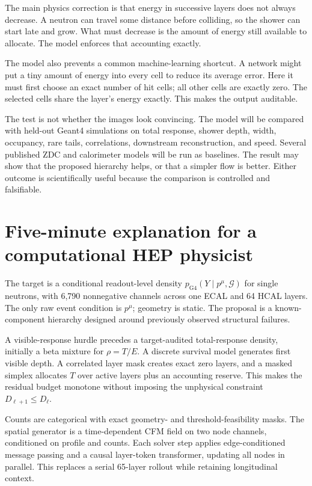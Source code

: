 \documentclass[11pt]{article}
\theoremstyle{definition}
\theoremstyle{remark}
\newcommand{\pG}{p_{\mathrm{G4}}}
\newcommand{\G}{\mathcal{G}}
\begin{document}
The main physics correction is that energy in successive layers does not always decrease. A neutron can travel some distance before colliding, so the shower can start late and grow. What must decrease is the amount of energy still available to allocate. The model enforces that accounting exactly.

The model also prevents a common machine-learning shortcut. A network might put a tiny amount of energy into every cell to reduce its average error. Here it must first choose an exact number of hit cells; all other cells are exactly zero. The selected cells share the layer's energy exactly. This makes the output auditable.

The test is not whether the images look convincing. The model will be compared with held-out Geant4 simulations on total response, shower depth, width, occupancy, rare tails, correlations, downstream reconstruction, and speed. Several published ZDC and calorimeter models will be run as baselines. The result may show that the proposed hierarchy helps, or that a simpler flow is better. Either outcome is scientifically useful because the comparison is controlled and falsifiable.

\section{Five-minute explanation for a computational HEP physicist}
The target is a conditional readout-level density $\pG(Y\mid p^\mu,\G)$ for single neutrons, with 6,790 nonnegative channels across one ECAL and 64 HCAL layers. The only raw event condition is $p^\mu$; geometry is static. The proposal is a known-component hierarchy designed around previously observed structural failures.

A visible-response hurdle precedes a target-audited total-response density, initially a beta mixture for $\rho=T/E$. A discrete survival model generates first visible depth. A correlated layer mask creates exact zero layers, and a masked simplex allocates $T$ over active layers plus an accounting reserve. This makes the residual budget monotone without imposing the unphysical constraint $D_{\ell+1}\le D_\ell$.

Counts are categorical with exact geometry- and threshold-feasibility masks. The spatial generator is a time-dependent CFM field on two node channels, conditioned on profile and counts. Each solver step applies edge-conditioned message passing and a causal layer-token transformer, updating all nodes in parallel. This replaces a serial 65-layer rollout while retaining longitudinal context.
\end{document}
